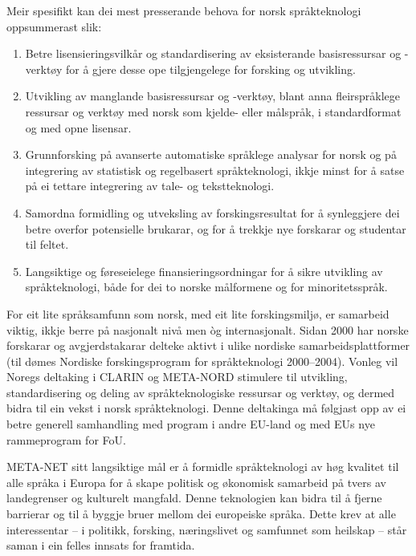 \begin{multicols}{2}
Meir spesifikt kan dei mest presserande behova for norsk språkteknologi oppsummerast slik:
\begin{enumerate}
\item Betre lisensieringsvilkår og standardisering av eksisterande basisressursar og -verktøy for å gjere desse ope tilgjengelege for forsking og utvikling.
\item Utvikling av manglande basisressursar og -verktøy, blant anna fleirspråklege ressursar og verktøy med norsk som kjelde- eller målspråk, i standardformat og med opne lisensar.
\item Grunnforsking på avanserte automatiske språklege analysar for norsk og på integrering av statistisk og regelbasert språkteknologi, ikkje minst for å satse på ei tettare integrering av tale- og tekstteknologi.
\item Samordna formidling og utveksling av forskingsresultat for å synleggjere dei betre overfor potensielle brukarar, og for å trekkje nye forskarar og studentar til feltet.
\item Langsiktige og føreseielege finansieringsordningar for å sikre utvikling av språkteknologi, både for dei to norske målformene og for minoritetsspråk.
\end{enumerate}

For eit lite språksamfunn som norsk, med eit lite forskingsmiljø, er samarbeid viktig, ikkje berre på nasjonalt nivå men òg internasjonalt. Sidan 2000 har norske forskarar og avgjerdstakarar delteke aktivt i ulike nordiske samarbeidsplattformer  (til dømes Nordiske forskingsprogram for språkteknologi 2000–2004). Vonleg vil Noregs deltaking i CLARIN og META-NORD stimulere til utvikling, standardisering og deling av språkteknologiske ressursar og verktøy, og dermed bidra til ein vekst i norsk språkteknologi.
Denne deltakinga må følgjast opp av ei betre generell samhandling med program i andre EU-land og med EUs nye rammeprogram for FoU.



META-NET sitt langsiktige mål er å formidle språkteknologi av høg kvalitet til alle språka i Europa for å skape politisk og økonomisk samarbeid på tvers av landegrenser og kulturelt mangfald. Denne teknologien kan bidra til å fjerne barrierar og til å byggje bruer mellom dei europeiske språka. Dette krev at alle interessentar – i politikk, forsking, næringslivet og samfunnet som heilskap – står saman i ein felles innsats for framtida.

\end{multicols}

